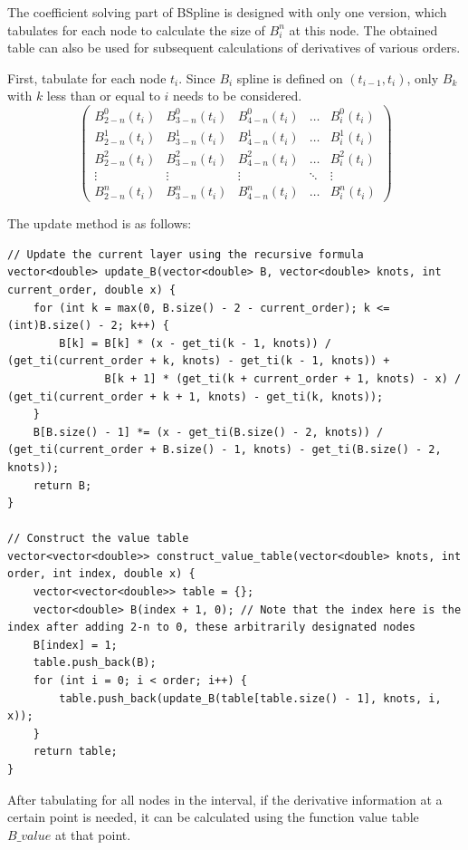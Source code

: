 \documentclass[a4paper]{article}
\begin{document}
The coefficient solving part of BSpline is designed with only one version, which tabulates for each node to calculate the size of $B^n_{i}$ at this node. The obtained table can also be used for subsequent calculations of derivatives of various orders.

First, tabulate for each node $t_i$. Since $B_i$ spline is defined on $(t_{i-1},t_i)$, only $B_k$ with $k$ less than or equal to $i$ needs to be considered.
\[
\begin{pmatrix}
B^0_{2-n}(t_i) & B^0_{3-n}(t_i) & B^0_{4-n}(t_i) & \dots & B^0_{i}(t_i) \\
B^1_{2-n}(t_i) & B^1_{3-n}(t_i) & B^1_{4-n}(t_i) & \dots & B^1_{i}(t_i) \\
B^2_{2-n}(t_i) & B^2_{3-n}(t_i) & B^2_{4-n}(t_i) & \dots & B^2_{i}(t_i) \\
\vdots & \vdots & \vdots & \ddots & \vdots \\
B^n_{2-n}(t_i) & B^n_{3-n}(t_i) & B^n_{4-n}(t_i) & \dots & B^n_{i}(t_i)
\end{pmatrix}
\]

The update method is as follows:
\begin{verbatim}
// Update the current layer using the recursive formula
vector<double> update_B(vector<double> B, vector<double> knots, int current_order, double x) {
    for (int k = max(0, B.size() - 2 - current_order); k <= (int)B.size() - 2; k++) {
        B[k] = B[k] * (x - get_ti(k - 1, knots)) / (get_ti(current_order + k, knots) - get_ti(k - 1, knots)) +
               B[k + 1] * (get_ti(k + current_order + 1, knots) - x) / (get_ti(current_order + k + 1, knots) - get_ti(k, knots));
    }
    B[B.size() - 1] *= (x - get_ti(B.size() - 2, knots)) / (get_ti(current_order + B.size() - 1, knots) - get_ti(B.size() - 2, knots));
    return B;
}

// Construct the value table
vector<vector<double>> construct_value_table(vector<double> knots, int order, int index, double x) {
    vector<vector<double>> table = {};
    vector<double> B(index + 1, 0); // Note that the index here is the index after adding 2-n to 0, these arbitrarily designated nodes
    B[index] = 1;
    table.push_back(B);
    for (int i = 0; i < order; i++) {
        table.push_back(update_B(table[table.size() - 1], knots, i, x));
    }
    return table;
}
\end{verbatim}

After tabulating for all nodes in the interval, if the derivative information at a certain point is needed, it can be calculated using the function value table $B\_value$ at that point.
\end{document}

